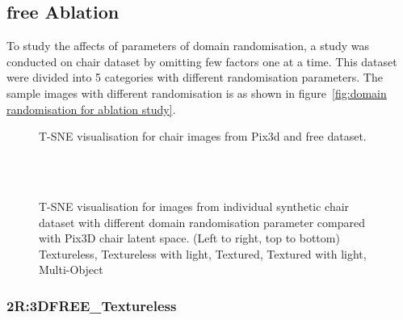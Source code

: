 \subsection{\Gls{free} Ablation}\label{subsec:s2r:3dfree-ablation}
To study the affects of parameters of domain randomisation, a study was conducted on chair dataset by omitting few factors one at a time.
This dataset were divided into 5 categories with different randomisation parameters.
The sample images with different randomisation is as shown in figure~\ref{fig:domain randomisation for ablation study}.


\begin{figure}
    \centering
    \resizebox{\textwidth}{!}{}
    \caption{T-SNE visualisation for chair images from Pix3d and \gls{free} dataset.}
    \label{fig:pix3dchair_s2r3dfreechair}
\end{figure}

\begin{figure}[!ht]
    \centering
    \resizebox{0.49\linewidth}{5cm}{}
    \resizebox{0.49\linewidth}{5cm}{}\\
    \resizebox{0.49\linewidth}{5cm}{}
    \resizebox{0.49\linewidth}{5cm}{}\\
    \resizebox{0.49\linewidth}{5cm}{}
    \caption{T-SNE visualisation for images from individual synthetic chair dataset with different domain randomisation parameter compared with Pix3D chair latent space.
        (Left to right, top to bottom) Textureless, Textureless with light, Textured, Textured with light, Multi-Object}
    \label{fig:tsne per chair dataset}
\end{figure}


\subsubsection{2R:3DFREE\_Textureless}

